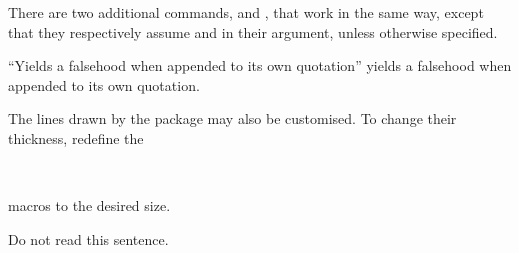 There are two additional commands,  and , that
work in the same way, except that they respectively assume  and
 in their  argument, unless otherwise specified.
\begin{example}[standalone, paperheight=3.5cm]
\geometry{includefoot, includehead, headsep=.5em, footskip=1em} %
\sloppy %
\usepackage{csquotes} %
\usepackage{fancyhdr}%
\pagestyle{fancy}%


\noindent %
\enquote{Yields a falsehood when
appended to its own quotation}
yields a falsehood when appended
to its own quotation.
\end{example}

The lines drawn by the  package may also be customised. To change
their thickness, redefine the
\begin{lscommand}
   \\
\end{lscommand}
macros to the desired size.
\begin{example}[standalone, paperheight=3cm, paperwidth=3cm]
\geometry{includefoot, includehead, headsep=.5em, footskip=1em} %
\sloppy %
\usepackage{fancyhdr} %
\pagestyle{fancy} %
\RenewDocumentCommand{\headrulewidth}{}{.2cm}
\RenewDocumentCommand{\footrulewidth}{}{.5cm}

\noindent %
Do not read this sentence.
\end{example}

